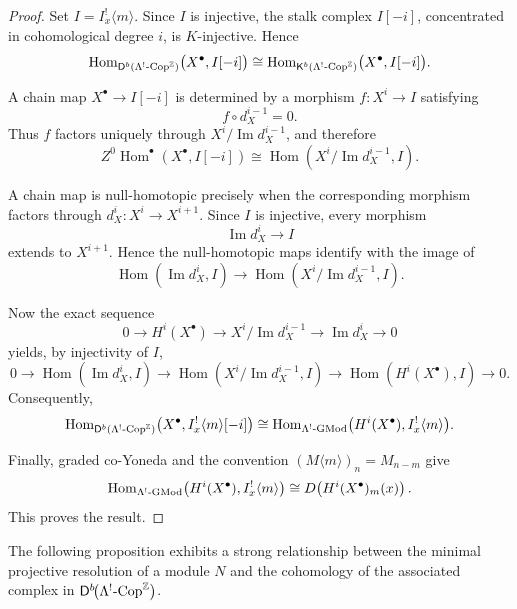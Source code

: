 \documentclass[11pt]{article}
\theoremstyle{definition}
\theoremstyle{remark}
\begin{document}
\begin{proof}
Set \(I=I_x^{!}\langle m\rangle\). Since \(I\) is injective, the stalk
complex \(I[-i]\), concentrated in cohomological degree \(i\), is
\(K\)-injective. Hence
\[
\operatorname{Hom}_{\mathsf{D}^{b}
(\Lambda^{!}\textup{-}\mathrm{Cop}^{\mathbb{Z}})}
\bigl(X^\bullet,I[-i]\bigr)
\cong
\operatorname{Hom}_{\mathsf{K}^{b}
(\Lambda^{!}\textup{-}\mathrm{Cop}^{\mathbb{Z}})}
\bigl(X^\bullet,I[-i]\bigr).
\]

A chain map \(X^\bullet\to I[-i]\) is determined by a morphism
\(f:X^i\to I\) satisfying
\[
f\circ d_X^{i-1}=0.
\]
Thus \(f\) factors uniquely through
\(X^i/\operatorname{Im}d_X^{i-1}\), and therefore
\[
Z^0\operatorname{Hom}^{\bullet}(X^\bullet,I[-i])
\cong
\operatorname{Hom}\!\left(
X^i/\operatorname{Im}d_X^{i-1},I
\right).
\]

A chain map is null-homotopic precisely when the corresponding morphism
factors through \(d_X^i:X^i\to X^{i+1}\). Since \(I\) is injective, every
morphism
\[
\operatorname{Im}d_X^i\longrightarrow I
\]
extends to \(X^{i+1}\). Hence the null-homotopic maps identify with the
image of
\[
\operatorname{Hom}(\operatorname{Im}d_X^i,I)
\longrightarrow
\operatorname{Hom}\!\left(
X^i/\operatorname{Im}d_X^{i-1},I
\right).
\]

Now the exact sequence
\[
0\longrightarrow H^i(X^\bullet)
\longrightarrow
X^i/\operatorname{Im}d_X^{i-1}
\longrightarrow
\operatorname{Im}d_X^i
\longrightarrow 0
\]
yields, by injectivity of \(I\),
\[
0\longrightarrow
\operatorname{Hom}(\operatorname{Im}d_X^i,I)
\longrightarrow
\operatorname{Hom}\!\left(
X^i/\operatorname{Im}d_X^{i-1},I
\right)
\longrightarrow
\operatorname{Hom}(H^i(X^\bullet),I)
\longrightarrow0.
\]
Consequently,
\[
\operatorname{Hom}_{\mathsf{D}^{b}
(\Lambda^{!}\textup{-}\mathrm{Cop}^{\mathbb{Z}})}
\bigl(X^\bullet,I_x^{!}\langle m\rangle[-i]\bigr)
\cong
\operatorname{Hom}_{\Lambda^{!}\textup{-}\mathrm{GMod}}
\bigl(H^i(X^\bullet),I_x^{!}\langle m\rangle\bigr).
\]

Finally, graded co-Yoneda and the convention
\((M\langle m\rangle)_n=M_{n-m}\) give
\[
\operatorname{Hom}_{\Lambda^{!}\textup{-}\mathrm{GMod}}
\bigl(H^i(X^\bullet),I_x^{!}\langle m\rangle\bigr)
\cong
D\!\left(H^i(X^\bullet)_m(x)\right).
\]
This proves the result.
\end{proof}

The following proposition exhibits a strong relationship between the minimal projective resolution of a module \(N\) and the cohomology of the associated complex in 
\(\mathsf{D}^{b}\!\bigl(\Lambda^{!}\textup{-Cop}^{\mathbb{Z}}\bigr)\).
\end{document}

